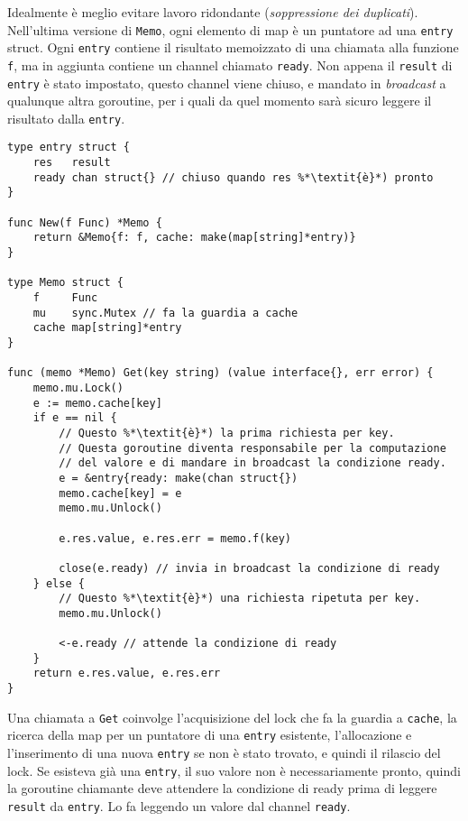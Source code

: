\documentclass[../../thesis.tex]{subfiles}
\begin{document}
    Idealmente è meglio evitare lavoro ridondante (\textit{soppressione dei duplicati}).
    Nell'ultima versione di \verb"Memo", ogni elemento di map è un puntatore ad una \verb"entry" struct.
    Ogni \verb"entry" contiene il risultato memoizzato di una chiamata alla funzione \verb"f", ma in aggiunta contiene un channel chiamato \verb"ready".
    Non appena il \verb"result" di \verb"entry" è stato impostato, questo channel viene chiuso, e mandato in \textit{broadcast} a qualunque altra goroutine, per i quali da quel momento sarà sicuro leggere il risultato dalla \verb"entry".
    \begin{lstlisting}[frame = single,label={lst:lstlisting9-7.7}]
type entry struct {
    res   result
    ready chan struct{} // chiuso quando res %*\textit{è}*) pronto
}

func New(f Func) *Memo {
    return &Memo{f: f, cache: make(map[string]*entry)}
}

type Memo struct {
    f     Func
    mu    sync.Mutex // fa la guardia a cache
    cache map[string]*entry
}

func (memo *Memo) Get(key string) (value interface{}, err error) {
    memo.mu.Lock()
    e := memo.cache[key]
    if e == nil {
        // Questo %*\textit{è}*) la prima richiesta per key.
        // Questa goroutine diventa responsabile per la computazione
        // del valore e di mandare in broadcast la condizione ready.
        e = &entry{ready: make(chan struct{})
        memo.cache[key] = e
        memo.mu.Unlock()
        
        e.res.value, e.res.err = memo.f(key)
        
        close(e.ready) // invia in broadcast la condizione di ready
    } else {
        // Questo %*\textit{è}*) una richiesta ripetuta per key.
        memo.mu.Unlock()
        
        <-e.ready // attende la condizione di ready
    }
    return e.res.value, e.res.err
}
    \end{lstlisting}
    Una chiamata a \verb"Get" coinvolge l'acquisizione del lock che fa la guardia a \verb"cache", la ricerca della map per un puntatore di una \verb"entry" esistente, l'allocazione e l'inserimento di una nuova \verb"entry" se non è stato trovato, e quindi il rilascio del lock.
    Se esisteva già una \verb"entry", il suo valore non è necessariamente pronto, quindi la goroutine chiamante deve attendere la condizione di ready prima di leggere \verb"result" da \verb"entry".
    Lo fa leggendo un valore dal channel \verb"ready".
    \hfill \vspace{12pt}
\end{document}

